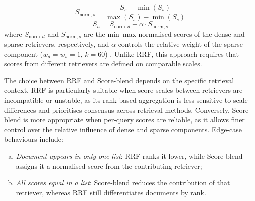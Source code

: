\begin{spacing}{1.5}
\begin{itemize}
\begin{itemize}
\[S_{\text{norm},s} = \frac{S_s - \min(S_s)}{\max(S_s) - \min(S_s)}
\]
\[
S_h = S_{\text{norm},d} + \alpha \cdot S_{\text{norm},s}
\]
where $S_{\text{norm},d}$ and $S_{\text{norm},s}$ are the min–max normalised scores of the dense and sparse retrievers, respectively, and $\alpha$ controls the relative weight of the sparse component ($w_d = w_s = 1$, $k = 60$) \citep{wang_searching_2024}. Unlike RRF, this approach requires that scores from different retrievers are defined on comparable scales.
\end{itemize}
\end{itemize}
\vspace{1em}

The choice between RRF and Score-blend depends on the specific retrieval context. RRF is particularly suitable when score scales between retrievers are incompatible or unstable, as its rank-based aggregation is less sensitive to scale differences and prioritises consensus across retrieval methods. Conversely, Score-blend is more appropriate when per-query scores are reliable, as it allows finer control over the relative influence of dense and sparse components. Edge-case behaviours include: 
\begin{enumerate}[(a)] 
\item \textit{Document appears in only one list}: RRF ranks it lower, while Score-blend assigns it a normalised score from the contributing retriever;
\item \textit{All scores equal in a list}: Score-blend reduces the contribution of that retriever, whereas RRF still differentiates documents by rank.
\end{enumerate}



\end{spacing}
